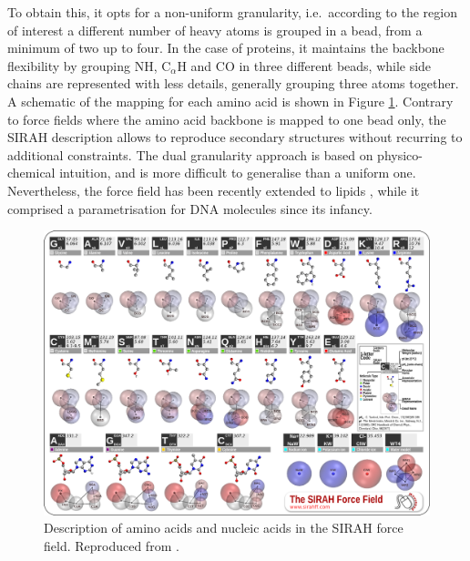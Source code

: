 To obtain this, it opts for a non-uniform granularity, i.e.\ according to the region of interest a different number of heavy atoms is grouped in a bead, from a minimum of two up to four. In the case of proteins, it maintains the backbone flexibility by grouping NH, C$_\alpha$H and CO in three different beads, while side chains are represented with less details, generally grouping three atoms together. A schematic of the mapping for each amino acid is shown in Figure \ref{fig:sirah}. Contrary to force fields where the amino acid backbone is mapped to one bead only, the SIRAH description allows to reproduce secondary structures without recurring to additional constraints.
%
The dual granularity approach is based on physico-chemical intuition, and is more difficult to generalise than a uniform one. Nevertheless, the force field has been recently extended to lipids \cite{Barrera2019}, while it comprised a parametrisation for DNA molecules since its infancy.
%
\begin{figure}[t!]
\centering
\includegraphics[width=0.8\linewidth]{2methods/pics/sirah_aa.png}
%
\caption[SIRAH force field amino acid and DNA description]{Description of amino acids and nucleic acids in the SIRAH force field. Reproduced from \cite{sirah_web}.}
\label{fig:sirah}
\end{figure}

